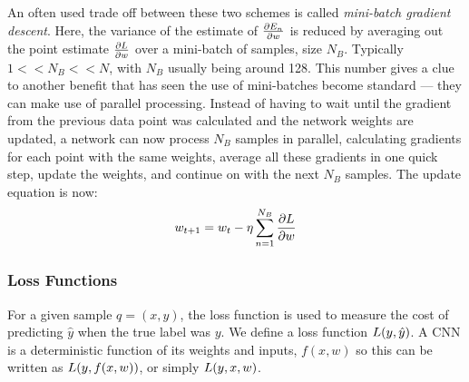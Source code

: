   An often used trade off between these two schemes is called \emph{mini-batch
  gradient descent}. Here, the variance of the estimate of $\frac{\partial E_n}{\partial w}$ is
  reduced by averaging out the point estimate $\frac{\partial L}{\partial w}$ over a mini-batch
  of samples, size $N_B$. Typically $1 << N_B << N$, with $N_B$ usually being
  around 128. This number gives a clue to another benefit that has seen the use
  of mini-batches become standard --- they can make use of parallel processing.
  Instead of having to wait until the gradient from the previous data point was
  calculated and the network weights are updated, a network can now process
  $N_B$ samples in parallel, calculating gradients for each point with the same
  weights, average all these gradients in one quick step, update the weights,
  and continue on with the next $N_B$ samples. The update equation is now:
  \begin{equation}
    w_{t+1} = w_{t} - \eta \sum_{n=1}^{N_B} \frac{\partial L}{\partial w}
  \end{equation}

\subsubsection{Loss Functions}
  For a given sample $q=(x, y)$, the loss
  function is used to measure the cost of predicting $\hat{y}$ when the
  true label was $y$. We define a loss function $L (y, \hat{y})$. 
  A CNN is a deterministic
  function of its weights and inputs, $f(x,w)$ so this can be written as $L
  (y, f(x,w))$, or simply $L(y, x, w)$.
  
